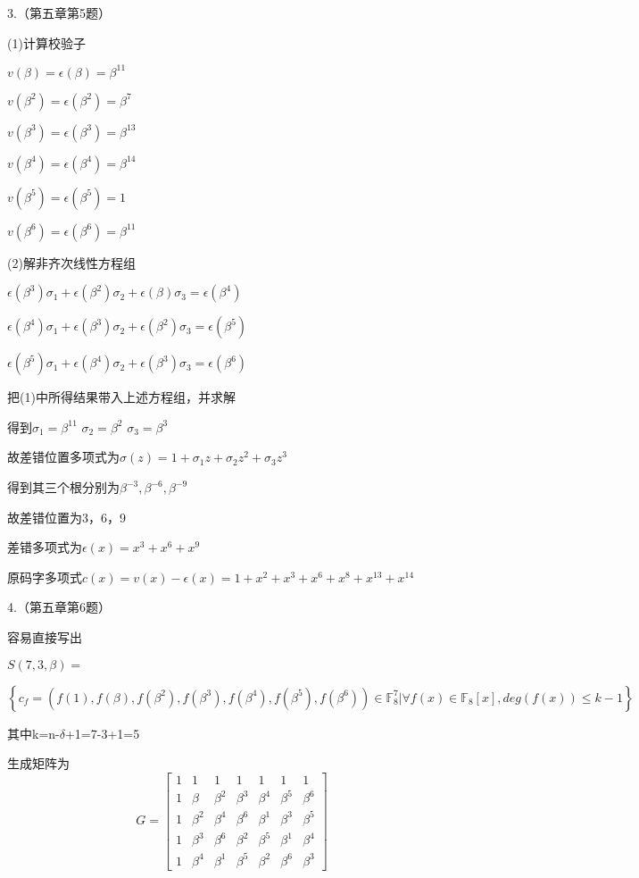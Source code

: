\documentclass{ctexart}
\begin{document}
    3.（第五章第5题）
    
    (1)计算校验子
    
    $v(\beta)=\epsilon(\beta)=\beta^{11}$
    
    $v(\beta^2)=\epsilon(\beta^2)=\beta^7$
    
    $v(\beta^3)=\epsilon(\beta^3)=\beta^{13}$
    
    $v(\beta^4)=\epsilon(\beta^4)=\beta^{14}$
    
    $v(\beta^5)=\epsilon(\beta^5)=1$
    
    $v(\beta^6)=\epsilon(\beta^6)=\beta^{11}$
    
    (2)解非齐次线性方程组
    
    $\epsilon(\beta^3)\sigma_1+\epsilon(\beta^2)\sigma_2+\epsilon(\beta) \sigma_3=\epsilon(\beta^4)$
    
     $\epsilon(\beta^4)\sigma_1+\epsilon(\beta^3)\sigma_2+\epsilon(\beta^2) \sigma_3=\epsilon(\beta^5)$
     
      $\epsilon(\beta^5)\sigma_1+\epsilon(\beta^4)\sigma_2+\epsilon(\beta^3) \sigma_3=\epsilon(\beta^6)$
      
     把(1)中所得结果带入上述方程组，并求解
     
     得到$\sigma_1=\beta^11$ $\sigma_2=\beta^2$ $\sigma_3=\beta^3$
     
     故差错位置多项式为$\sigma(z)=1+\sigma_1z+\sigma_2z^2+\sigma_3z^3$
     
     得到其三个根分别为$\beta^{-3},\beta^{-6}, \beta^{-9}$
     
     故差错位置为3，6，9
     
     差错多项式为$\epsilon(x)=x^3+x^6+x^9$
     
     原码字多项式$c(x)=v(x)-\epsilon(x)=1+x^2+x^3+x^6+x^8+x^{13}+x^{14}$
    
	
	
	
	
	
	4.（第五章第6题）
	
	容易直接写出
	
	$S(7,3,\beta)=$ 
	
	$\left\lbrace c_f=(f(1),f(\beta),f(\beta^2),f(\beta^3),f(\beta^4),f(\beta^5),f(\beta^6)) \in \mathbb{F}_8^7|\forall f(x) \in \mathbb{F}_8[x], deg(f(x))\leq k-1\right\rbrace$
	
	其中k=n-$\delta$+1=7-3+1=5
   
   生成矩阵为$$G=
   \begin{bmatrix}
   1 & 1 & 1 & 1& 1& 1& 1\\
   1 & \beta & \beta^2 & \beta^3& \beta^4& \beta^5& \beta^6\\
   1 & \beta^2 & \beta^4 & \beta^6& \beta^1& \beta^3& \beta^5\\
   1 & \beta^3 & \beta^6 & \beta^2& \beta^5& \beta^1& \beta^4\\
   1 & \beta^4 & \beta^1 & \beta^5& \beta^2& \beta^6& \beta^3
   \end{bmatrix} 
   $$
\end{document}
